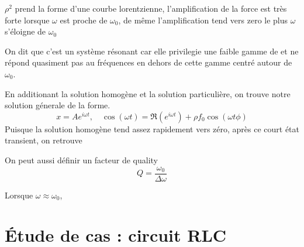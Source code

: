 \documentclass{article}
\begin{document}
\FloatBarrier

$\rho^2$ prend la forme d'une courbe lorentzienne, l'amplification de la force est très forte lorsque $\omega$ est proche de $\omega_0$, de même l'amplification tend vers zero le plus $\omega$ s'éloigne de $\omega_0$

On dit que c'est un système résonant car elle privilegie une faible gamme de et ne répond quasiment pas au fréquences en dehors de cette gamme centré autour de $\omega_0$.

En additionant la solution homogène et la solution particulière, on trouve notre solution génerale de la forme.
\[ x = Ae^{i\omega t}, \quad \cos(\omega t) = \Re(e^{i \omega t}) + \rho f_0 \cos(\omega t \phi) \]
Puisque la solution homogène tend assez rapidement vers zéro, après ce court état transient, on retrouve 


On peut aussi définir un facteur de quality
\[ Q = \frac{\omega_0}{\Delta\omega} \]

Lorsque $\omega \approx \omega_0$, 



\section{Étude de cas : circuit RLC}
\end{document}
